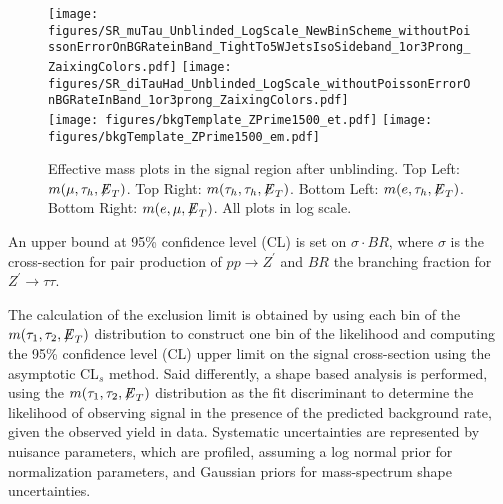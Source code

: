 \begin{figure}[tbh!]
  \centering
   \texttt{[image: figures/SR\_muTau\_Unblinded\_LogScale\_NewBinScheme\_withoutPoissonErrorOnBGRateinBand\_TightTo5WJetsIsoSideband\_1or3Prong\_ZaixingColors.pdf]}
   \texttt{[image: figures/SR\_diTauHad\_Unblinded\_LogScale\_withoutPoissonErrorOnBGRateInBand\_1or3prong\_ZaixingColors.pdf]} \\
   \texttt{[image: figures/bkgTemplate\_ZPrime1500\_et.pdf]}
   \texttt{[image: figures/bkgTemplate\_ZPrime1500\_em.pdf]}
  \caption{Effective mass plots in the signal region after unblinding. Top Left: $m(\mu,\tau_{h},{\not\mathrel{E}}_T)$.  Top Right: $m(\tau_{h},\tau_{h},{\not\mathrel{E}}_T)$.  Bottom Left: $m(e,\tau_{h},{\not\mathrel{E}}_T)$.  Bottom Right: $m(e,\mu,{\not\mathrel{E}}_T)$. All plots in log scale.}
    \label{fig:SignalRegionPlot_a}
\end{figure}


An upper bound at 95\% confidence level (CL) is set on $\sigma \cdot BR$, 
where $\sigma$ is the cross-section for pair production of $pp\to Z^{\prime}$ and $BR$ the branching fraction for $Z^{\prime}\to\tau\tau$.

The calculation of the exclusion limit is obtained by using each bin of the $m(\tau_{1},\tau_{2},{\not\mathrel{E}}_T)$ distribution to construct one bin of the likelihood 
and computing the 95\% confidence level (CL) upper limit on the signal cross-section using the asymptotic CL$_{s}$ method. 
Said differently, a shape based analysis is performed, using the $m(\tau_{1},\tau_{2},{\not\mathrel{E}}_T)$ distribution as the fit discriminant to determine the 
likelihood of observing signal in the presence of the predicted background rate, given the observed yield in data. Systematic uncertainties are represented by nuisance parameters, which are profiled, assuming a log normal prior for normalization parameters, and Gaussian priors for mass-spectrum shape uncertainties.

